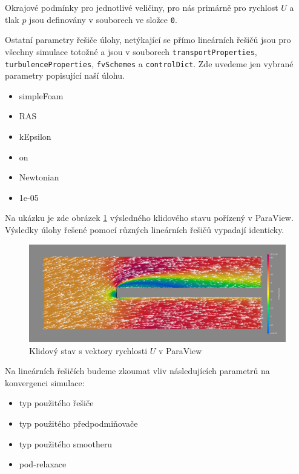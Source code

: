 \documentclass[a4paper,12pt]{report}
\theoremstyle{remark}
\begin{document}
Okrajové podmínky pro jednotlivé veličiny, pro nás primárně pro rychlost $U$ a tlak $p$  jsou definovány v souborech ve složce \texttt{0}.

Ostatní parametry řešiče úlohy, netýkající se přímo lineárních řešičů jsou pro všechny simulace totožné a jsou v souborech \texttt{transportProperties}, \texttt{turbulenceProperties}, \texttt{fvSchemes} a \texttt{controlDict}. Zde uvedeme jen vybrané parametry popisující naší úlohu.

\begin{itemize}
	\item{simpleFoam}
	\item{RAS}
	\item{kEpsilon}
	\item{on}
	\item{Newtonian}
	\item{1e-05}
\end{itemize}


	
Na ukázku je zde obrázek \ref{fig:pv-GAMG-GS} výsledného klidového stavu pořízený v ParaView. Výsledky úlohy řešené pomocí různých lineárních řešičů vypadají identicky.
	
	 \begin{figure}[H]
		\centering
		\includegraphics[width=1\linewidth]{pv-GAMG-GS.png}
		\caption{Klidový stav s vektory rychlosti $U$ v ParaView}
		\label{fig:pv-GAMG-GS}
	\end{figure}


Na lineárních řešičích budeme zkoumat vliv následujících parametrů na konvergenci simulace:
 
\begin{itemize}
	\item typ použitého řešiče
	\item typ použitého předpodmiňovače
	\item typ použitého smootheru
	\item pod-relaxace
\end{itemize}
\end{document}
